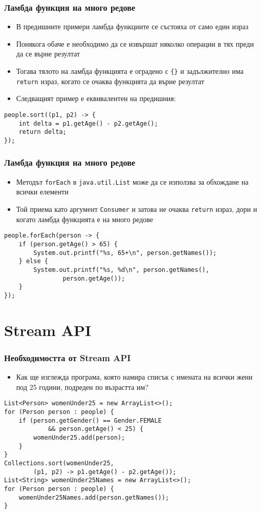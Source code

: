 \documentclass[ignorenonframetext, hyperref=unicode,compress,pdflatex]{beamer}
\begin{document}
\begin{frame}[containsverbatim]\frametitle{Ламбда функция на много редове}
\begin{itemize}
  \item В предишните примери ламбда функциите се състояха от само един израз
  \item Понякога обаче е необходимо да се извършат няколко операции в тях преди
  да се върне резултат
  \item Тогава тялото на ламбда функцията е оградено с
  \lstinline[mathescape]!{}! и задължително има \lstinline{return} израз, когато
  се очаква функцията да върне резултат
  \item Следващият пример е еквивалентен на предишния:
\end{itemize}
\begin{lstlisting}
people.sort((p1, p2) -> {
	int delta = p1.getAge() - p2.getAge();
	return delta;
});
\end{lstlisting}
\end{frame}

\begin{frame}[containsverbatim]\frametitle{Ламбда функция на много редове}
\begin{itemize}
  \item Методът \lstinline{forEach} в \lstinline{java.util.List} може да се
  използва за обхождане на всички елементи
  \item Той приема като аргумент \lstinline{Consumer} и затова не очаква
  \lstinline{return} израз, дори и когато ламбда функцията е на много редове
\end{itemize}
\begin{lstlisting}
people.forEach(person -> {
	if (person.getAge() > 65) {
		System.out.printf("%s, 65+\n", person.getNames());
	} else {
		System.out.printf("%s, %d\n", person.getNames(),
				person.getAge());
	}
});
\end{lstlisting}
\end{frame}

\section{Stream API}

\begin{frame}[containsverbatim]\frametitle{Необходимостта от Stream API}
\begin{itemize}
  \item Как ще изглежда програма, която намира списък с имената на всички жени
  под 25 години, подреден по възрастта им?
\end{itemize}
\begin{lstlisting}
List<Person> womenUnder25 = new ArrayList<>();
for (Person person : people) {
	if (person.getGender() == Gender.FEMALE
			&& person.getAge() < 25) {
		womenUnder25.add(person);
	}
}
Collections.sort(womenUnder25,
		(p1, p2) -> p1.getAge() - p2.getAge());
List<String> womenUnder25Names = new ArrayList<>();
for (Person person : people) {
	womenUnder25Names.add(person.getNames());
}
\end{lstlisting}
\end{frame}
\end{document}
